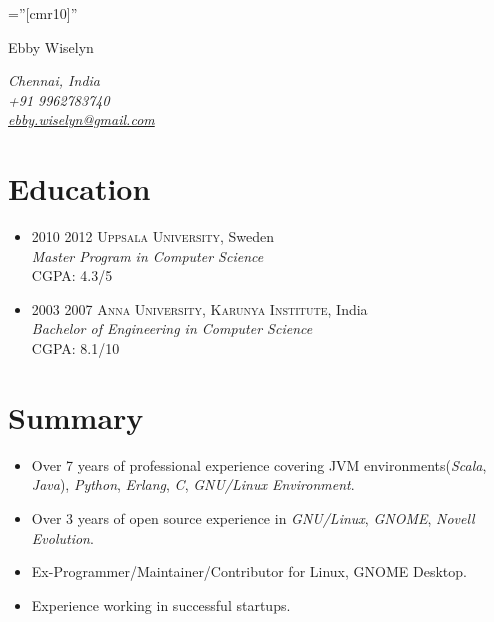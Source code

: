 \documentclass[a4paper,10pt]{article}
\begin{document}

\pagestyle{empty} %

\font\fb=''[cmr10]'' %

\par{\centering
		{\Large Ebby Wiselyn
	        }\smallskip
\par}

\begin{flushright}
  \emph{Chennai, India} \\
  \emph{+91 9962783740} \\
  \emph{\href{mailto:ebby.wiselyn@gmail.com}{ebby.wiselyn@gmail.com}} \\
\end{flushright}

\section{Education}
\begin{itemize}

\item \textsc{2010 2012} \textsc{Uppsala University}, Sweden \\
\emph{Master Program in Computer Science}\\
\normalsize \textsc{CGPA}: 4.3/5

\item \textsc{2003 2007} \textsc{Anna University, Karunya Institute}, India \\
\emph{Bachelor of Engineering in Computer Science}\\
\normalsize \textsc{CGPA}: 8.1/10

\end{itemize}

\section{Summary}
  \begin{itemize}
  \item Over 7 years of professional experience covering JVM environments(\emph{Scala}, \emph{Java}), \emph{Python}, \emph{Erlang}, \emph{C}, \emph{GNU/Linux Environment}.
  \item Over 3 years of open source experience in \emph{GNU/Linux}, \emph{GNOME}, \emph{Novell Evolution}.
  \item Ex-Programmer/Maintainer/Contributor for Linux, GNOME Desktop.
  \item Experience working in successful startups.
  \end{itemize}
\end{document}
